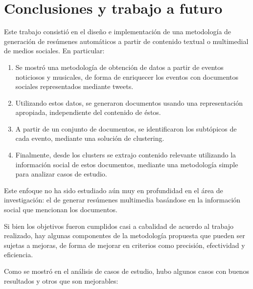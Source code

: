 
\chapter{Conclusiones y trabajo a futuro}
\label{sec-5}

\label{cap:conclusiones}

Este trabajo consistió en el diseño e implementación de una
metodología de generación de resúmenes automáticos a partir de
contenido textual o multimedial de medios sociales. En particular:

\begin{enumerate}
\item Se mostró una metodología de obtención de datos a partir de eventos
   noticiosos y musicales, de forma de enriquecer los eventos con
   documentos sociales representados mediante tweets.
\item Utilizando estos datos, se generaron documentos usando una
   representación apropiada, independiente del contenido de éstos.
\item A partir de un conjunto de documentos, se identificaron los
   subtópicos de cada evento, mediante una solución de clustering.
\item Finalmente, desde los clusters se extrajo contenido relevante
   utilizando la información social de estos documentos, mediante una
   metodología simple para analizar casos de estudio.
\end{enumerate}

Este enfoque no ha sido estudiado aún muy en profundidad en el área de
investigación: el de generar resúmenes multimedia basándose en la
información social que mencionan los documentos.



Si bien los objetivos fueron cumplidos casi a cabalidad de acuerdo al
trabajo realizado, hay algunas componentes de la metodología propuesta
que pueden ser sujetas a mejoras, de forma de mejorar en criterios
como precisión, efectividad y eficiencia.

Como se mostró en el análisis de casos de estudio, hubo algunos casos
con buenos resultados y otros que son mejorables:

